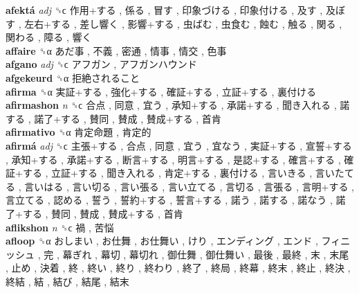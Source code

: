 \textbf{afektá} \emph{adj}  ␝ϲ   作用+する ,  係る ,  冒す ,  印象づける ,  印象付ける ,  及す ,  及ぼす ,  左右+する ,  差し響く ,  影響+する ,  虫ばむ ,  虫食む ,  蝕む ,  触る ,  関る ,  関わる ,  障る ,  響く   \\
\textbf{affaire} ␝α   あだ事 ,  不義 ,  密通 ,  情事 ,  情交 ,  色事   \\
\textbf{afgano} \emph{adj}  ␝ϲ   アフガン ,  アフガンハウンド   \\
\textbf{afgekeurd} ␝α   拒絶されること   \\
\textbf{afirma} ␝α   実証+する ,  強化+する ,  確証+する ,  立証+する ,  裏付ける   \\
\textbf{afirmashon} \emph{n}  ␝ϲ   合点 ,  同意 ,  宜う ,  承知+する ,  承諾+する ,  聞き入れる ,  諾する ,  諾了+する ,  賛同 ,  賛成 ,  賛成+する ,  首肯   \\
\textbf{afirmativo} ␝α   肯定命題 ,  肯定的   \\
\textbf{afirmá} \emph{adj}  ␝ϲ   主張+する ,  合点 ,  同意 ,  宜う ,  宜なう ,  実証+する ,  宣誓+する ,  承知+する ,  承諾+する ,  断言+する ,  明言+する ,  是認+する ,  確言+する ,  確証+する ,  立証+する ,  聞き入れる ,  肯定+する ,  裏付ける ,  言いきる ,  言いたてる ,  言いはる ,  言い切る ,  言い張る ,  言い立てる ,  言切る ,  言張る ,  言明+する ,  言立てる ,  認める ,  誓う ,  誓約+する ,  誓言+する ,  諾う ,  諾する ,  諾なう ,  諾了+する ,  賛同 ,  賛成 ,  賛成+する ,  首肯   \\
\textbf{aflikshon} \emph{n}  ␝ϲ   禍 ,  苦悩   \\
\textbf{afloop} ␝α   おしまい ,  お仕舞 ,  お仕舞い ,  けり ,  エンディング ,  エンド ,  フィニッシュ ,  完 ,  幕ぎれ ,  幕切 ,  幕切れ ,  御仕舞 ,  御仕舞い ,  最後 ,  最終 ,  末 ,  末尾 ,  止め ,  決着 ,  終 ,  終い ,  終り ,  終わり ,  終了 ,  終局 ,  終幕 ,  終末 ,  終止 ,  終決 ,  終結 ,  結 ,  結び ,  結尾 ,  結末   \\
